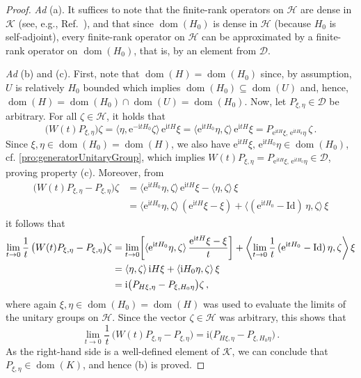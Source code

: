 \documentclass[a4paper, twoside, 11pt, reqno]{amsart}
\theoremstyle{definition}
\theoremstyle{plain}
\renewcommand{\subset}{\subseteq}
\let\originalleft\left
\let\originalright\right
\renewcommand{\left}{\mathopen{}\mathclose\bgroup\originalleft}
\renewcommand{\right}{\aftergroup\egroup\originalright}
\newcommand{\MD}{\mathcal{D}}
\newcommand{\MH}{\mathcal{H}}
\newcommand{\MK}{\mathcal{K}}
\newcommand{\ii}{\mathrm{i}}
\newcommand{\ee}{\mathrm{e}}
\newcommand{\id}{\mathrm{Id}}
\newcommand{\1}{\mathbf{1}}
\DeclareMathOperator{\dom}{dom}
\newcommand{\braket}[2][]{#1\langle{#2}#1\rangle}
\newcommand{\Braket}[1]{\left\langle #1 \right\rangle}
\newcommand{\tAd}{\textit{Ad}}
\begin{document}
\begin{proof}
    \tAd{} (a). It suffices to note that the finite-rank operators on $\MH$ are dense in $\MK$ (see, e.g., Ref.~\cite[Cor. 26.4]{BlanchardBruening2015}), and that since $\dom(H_0)$ is dense in $\MH$ (because $H_0$ is self-adjoint), every finite-rank operator on $\MH$ can be approximated by a finite-rank operator on $\dom(H_0)$, that is, by an element from $\MD$.
    
    \tAd{} (b) and (c). First, note that $\dom(H) = \dom(H_0)$ since, by assumption, $U$ is relatively $H_0$ bounded which implies $\dom(H_0) \subset \dom(U)$ and, hence, $\dom(H) = \dom(H_0) \cap \dom(U) = \dom(H_0)$. Now, let $P_{\xi, \eta} \in \MD$ be arbitrary.  For all $\zeta \in \MH$, it holds that
    \begin{equation*}
        \bigl(W(t) P_{\xi, \eta}\bigr) \zeta =  \braket{\eta, \ee^{- \ii t H_0} \zeta} \, \ee^{\ii t H} \xi = \braket{\ee^{\ii t H_0} \eta, \zeta} \, \ee^{\ii t H} \xi = P_{\ee^{\ii t H} \xi, \, \ee^{\ii t H_0} \eta} \, \zeta \, .
    \end{equation*}
    Since $\xi, \eta \in \dom(H_0) = \dom(H)$, we also have $\ee^{\ii t H} \xi, \, \ee^{\ii t H_0} \eta \in \dom(H_0)$, cf. \cref{pro:generatorUnitaryGroup}, which implies $W(t) P_{\xi, \eta} = P_{\ee^{\ii t H} \xi, \, \ee^{\ii t H_0} \eta} \in \MD$, proving property (c). Moreover, from
    \begin{align*}
        \bigl(W(t) P_{\xi, \eta} - P_{\xi, \eta}\bigr) \zeta &= \braket{\ee^{\ii t H_0} \eta, \zeta} \, \ee^{\ii t H} \xi - \braket{\eta, \zeta} \, \xi \\
        &= \braket{\ee^{\ii t H_0} \eta, \zeta} \, (\ee^{\ii t H} \xi - \xi) + \braket[\big]{(\ee^{\ii t H_0} - \id) \, \eta, \zeta} \, \xi
    \end{align*}
    it follows that
    \begin{align*}
        \lim_{t \to 0} \frac{1}{t} \, \bigl(W(t) P_{\xi, \eta} - P_{\xi, \eta}\bigr) \zeta &= \lim_{t \to 0} \left[\braket{\ee^{\ii t H_0} \eta, \zeta} \, \frac{\ee^{\ii t H} \xi - \xi}{t}\right] + \Braket{\lim_{t \to 0} \frac{1}{t} \, (\ee^{\ii t H_0} - \id) \, \eta, \zeta} \, \xi \\
        &= \braket{\eta, \zeta} \, \ii H \xi + \braket{\ii H_0 \eta, \zeta} \, \xi \\
        &= \ii \bigl(P_{H \xi, \eta} - P_{\xi, H_0 \eta}\bigr) \zeta \, ,
    \end{align*}
    where again $\xi, \eta \in \dom(H_0) = \dom(H)$ was used to evaluate the limits of the unitary groups on $\MH$. Since the vector $\zeta \in \MH$ was arbitrary, this shows that
    \begin{equation*}
        \lim_{t \to 0} \frac{1}{t} \, \bigl(W(t) P_{\xi, \eta} - P_{\xi, \eta}\bigr) = \ii \bigl(P_{H \xi, \eta} - P_{\xi, H_0 \eta}\bigr) \, .
    \end{equation*}
    As the right-hand side is a well-defined element of $\MK$, we can conclude that $P_{\xi, \eta} \in \dom(K)$, and hence (b) is proved.


\end{proof}
\end{document}
